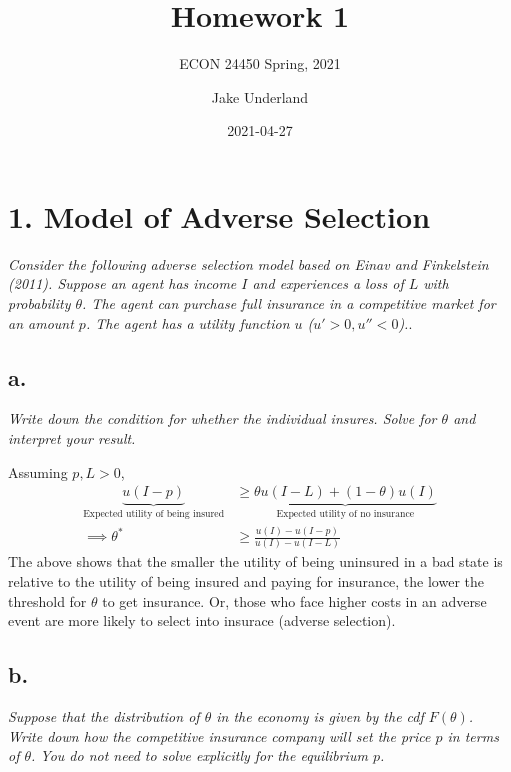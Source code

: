 \documentclass[
]{article}
\title{Homework 1}
\subtitle{ECON 24450 Spring, 2021}
\author{Jake Underland}
\date{2021-04-27}
\begin{document}
\maketitle

{
\setcounter{tocdepth}{2}
\tableofcontents
}
\newcommand{\argmax}{\mathop{\mathrm{argmax}}}

\hypertarget{model-of-adverse-selection}{%
\section{1. Model of Adverse
Selection}\label{model-of-adverse-selection}}

\textit{Consider the following adverse selection model based on Einav and Finkelstein (2011). Suppose an agent has income $I$ and experiences a loss of $L$ with probability $\theta$. The agent can purchase full insurance in a competitive market for an amount $p$. The agent has a utility function $u$ ($u' > 0, u'' < 0$).}.

\hypertarget{a.}{%
\subsection{a.}\label{a.}}

\textit{Write down the condition for whether the individual insures. Solve for $\theta$ and interpret your result.}

Assuming \(p, L>0\), \[\begin{aligned}
\underbrace{u(I-p)}_{\text{Expected utility of being insured}} &\geq \underbrace{\theta u(I-L) + (1 - \theta)u(I)}_{\text{Expected utility of no insurance}} \\ 
\implies \theta ^ * &\geq \frac{u(I) - u(I-p)}{u(I) - u(I-L)}
\end{aligned}\] The above shows that the smaller the utility of being
uninsured in a bad state is relative to the utility of being insured and
paying for insurance, the lower the threshold for \(\theta\) to get
insurance. Or, those who face higher costs in an adverse event are more
likely to select into insurace (adverse selection).

\hypertarget{b.}{%
\subsection{b.}\label{b.}}

\textit{Suppose that the distribution of $\theta$ in the economy is given by the cdf $F(\theta)$. Write down how the competitive insurance company will set the price $p$ in terms of $\theta$. You do not need to solve explicitly for the equilibrium $p$.}
\end{document}
